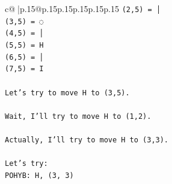 \documentclass{article}
\begin{document}
{\begin{supertabular}{c@{$\;$}|p{.15\linewidth}@{}p{.15\linewidth}p{.15\linewidth}p{.15\linewidth}p{.15\linewidth}p{.15\linewidth}}
{{{\texttt{(2,5) = │} \\
\texttt{(3,5) = ◌} \\
\texttt{(4,5) = │} \\
\texttt{(5,5) = H} \\
\texttt{(6,5) = │} \\
\texttt{(7,5) = I} \\
\\ 
\texttt{Let's try to move H to (3,5).} \\
\\ 
\texttt{Wait, I'll try to move H to (1,2).} \\
\\ 
\texttt{Actually, I'll try to move H to (3,3).} \\
\\ 
\texttt{Let's try:} \\
\texttt{POHYB: H, (3, 3)} \\
            }
        }
    }
     \\ \\


\end{supertabular}}
\end{document}
